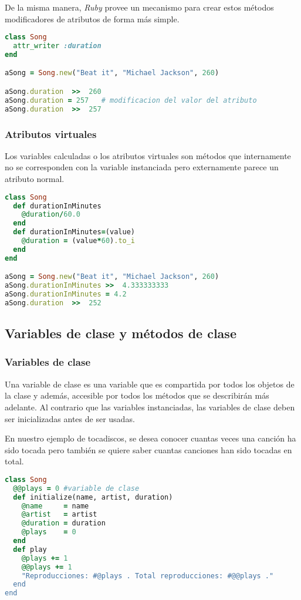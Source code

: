 De la misma manera, \textit{Ruby} provee un mecanismo para crear estos métodos modificadores de atributos de forma más simple.

\begin{lstlisting}[language=Ruby]
class Song
  attr_writer :duration
end

aSong = Song.new("Beat it", "Michael Jackson", 260)

aSong.duration	>>	260
aSong.duration = 257   # modificacion del valor del atributo
aSong.duration  >>	257
\end{lstlisting}

\subsubsection{Atributos virtuales}
Los variables calculadas o los atributos virtuales son métodos que internamente no se corresponden con la variable instanciada pero externamente parece un atributo normal.

\begin{lstlisting}[language=Ruby]
class Song
  def durationInMinutes
    @duration/60.0
  end
  def durationInMinutes=(value)
    @duration = (value*60).to_i
  end
end

aSong = Song.new("Beat it", "Michael Jackson", 260)
aSong.durationInMinutes	>>	4.333333333
aSong.durationInMinutes = 4.2
aSong.duration	>>	252
\end{lstlisting}

\subsection{Variables de clase y métodos de clase}
\subsubsection{Variables de clase}
Una variable de clase es una variable que es compartida por todos los objetos de la clase y además, accesible por todos los métodos que se describirán más adelante. Al contrario que las variables instanciadas, las variables de clase deben ser inicializadas antes de ser usadas.

En nuestro ejemplo de tocadiscos, se desea conocer cuantas veces una canción ha sido tocada pero también se quiere saber cuantas canciones han sido tocadas en total.

\begin{lstlisting}[language=Ruby]
class Song
  @@plays = 0 #variable de clase
  def initialize(name, artist, duration)
    @name     = name
    @artist   = artist
    @duration = duration
    @plays    = 0
  end
  def play
    @plays += 1
    @@plays += 1
    "Reproducciones: #@plays . Total reproducciones: #@@plays ."
  end
end
\end{lstlisting}

